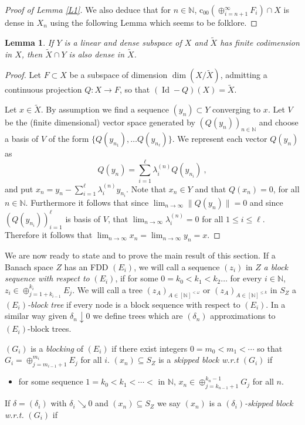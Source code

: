 \documentclass[11pt,leqno]{amsart}
\newtheorem{lem}[thm]{Lemma}
\theoremstyle{definition}
\newcommand{\coo}{\mbox{c}_{00}}
\newcommand{\Id}{\operatorname{Id}}
\newcommand{\N}{\mathbb{N}}
\newcommand{\fN}{[\N]^{<\omega}}
\newcommand{\kN}{[\N]^{\le k}}
\begin{document}
\begin{proof}[Proof of Lemma \ref{L1}]
We also deduce that for $n\in\N$, $\coo(\oplus_{i=n+1}^\infty F_i)\cap X$ 
is dense in $X_n$ using 
the following Lemma which seems to be folklore.
\end{proof}
 
\begin{lem}\label{L2}
If $Y$ is a linear and dense subspace of $X$ 
and $\tilde X$ has finite codimension in $X$, 
then $\tilde X\cap Y$ is also dense in $\tilde X$.
\end{lem}

\begin{proof}
Let $F\subset X$ be a subspace of dimension $\dim(X/\tilde X)$, admitting 
a continuous  projection $Q:X\to F$, so that $(\Id-Q)(X)=\tilde X$.

Let $x\in\tilde X$. By assumption we find a sequence $(y_n)\subset Y$ 
converging to $x$.
Let $V$ be the (finite dimensional) vector space generated by 
$(Q(y_n))_{n\in\N}$ and choose a basis of $V$ of the form 
$\{Q(y_{n_1}),\ldots Q(y_{n_\ell})\}$. 
We represent each vector $Q(y_n)$ as
$$ Q(y_n)=\sum_{i=1}^\ell \lambda_i^{(n)}Q(y_{n_i})\ ,$$
and put $x_n=y_n- \sum_{i=1}^\ell  \lambda_i^{(n)}y_{n_i}$.
Note that $x_n\in Y$ and that $Q(x_n)=0$, for all $n\in\N$.
Furthermore it follows that since $\lim_{n\to\infty}\|Q(y_n)\|=0$ 
and since $(Q(y_{n_i}))_{i=1}^\ell$ is
basis of $V$, that $\lim_{n\to\infty} \lambda^{(n)}_i=0$ 
for all $1\le i\le\ell$.
Therefore it follows that 
$\lim_{n\to\infty} x_n=\lim_{n\to\infty} y_n=x$.
\end{proof}
  
We are now ready to state and to prove the main result of this section. 
If a Banach space  $Z$ has an FDD $(E_i)$, we will call a sequence $(z_i)$ 
in $Z$ {\em a block sequence with respect to\/} $(E_i)$, 
if for some $0=k_0<k_1<k_2\ldots$ 
for every $i\in\N$, $z_i\in\oplus_{j=1+k_{i-1}}^{k_i} E_j$. 
We will call a tree $(z_A)_{A\in\fN}$ or $(z_A)_{A\in\kN}$ in $S_Z$ a 
{\em $(E_i)$-block tree\/}
if every node is a block sequence with respect to  $(E_i)$.
In a similar way given $\delta_n\downarrow 0$ 
we define trees which are $(\delta_n)$ 
approximations to $(E_i)$-block trees. 
   
$(G_i)$ is a {\em blocking\/} of $(E_i)$ if there exist integers 
$0 = m_0<m_1<\cdots$ so that $G_i = \oplus_{j=m_{i-1}+1}^{m_i} E_j$ for all $i$. 
$(x_n)\subseteq S_Z$ is a {\em skipped block w.r.t $(G_i)$} if 
\begin{itemize}
\item[(SB)] \qquad for some sequence  $1=k_0<k_1<\cdots < $ in $\N$,
$x_n\in \oplus_{j=k_{n-1}+1}^{k_n-1} G_j$ for all $n$.
\end{itemize}
If $\delta= (\delta_i)$ with $\delta_i\searrow 0$ and $(x_n) \subseteq S_Z$
we say $(x_n)$ is a {\em $(\delta_i)$-skipped block w.r.t.\/} $(G_i)$ if 
\end{document}
